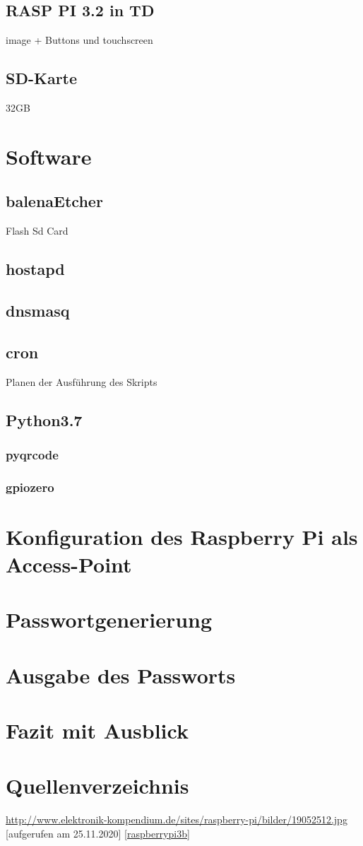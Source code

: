 \documentclass[a4paper,11pt,singlespacing]{article}
\begin{document}
		\subsection{RASP PI 3.2 in TD}
			image + Buttons und touchscreen
		\subsection{SD-Karte}
    			32GB
    			
    	\section{Software}
    		\subsection{balenaEtcher}
    			Flash Sd Card
		\subsection{hostapd}
    		\subsection{dnsmasq}
    		\subsection{cron}
			Planen der Ausführung des Skripts
    		\subsection{Python3.7}
    			\subsubsection{pyqrcode}
    			\subsubsection{gpiozero}
    	\section{Konfiguration des Raspberry Pi als Access-Point}
    	
    	\section{Passwortgenerierung}
    	
    	\section{Ausgabe des Passworts}
    	
    	\section{Fazit mit Ausblick}
    	
    	\section{Quellenverzeichnis}
    	
    	\url{http://www.elektronik-kompendium.de/sites/raspberry-pi/bilder/19052512.jpg} [aufgerufen am 25.11.2020] \ref{raspberrypi3b}
    	
\end{document}
